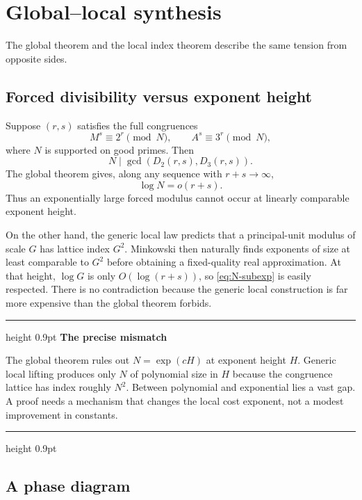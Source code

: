\documentclass[11pt,oneside]{article}
\theoremstyle{definition}
\newenvironment{resultbox}[1]{%
  \par\medskip\noindent
  \begin{minipage}{\linewidth}
  \hrule height 0.9pt\vspace{0.5em}
  {\color{deepteal}\bfseries #1}\par\smallskip
}{%
  \vspace{0.35em}\hrule height 0.9pt
  \end{minipage}\par\medskip
}
\begin{document}
\section{Global--local synthesis}\label{sec:synthesis}

The global theorem and the local index theorem describe the same tension
from opposite sides.

\subsection{Forced divisibility versus exponent height}

Suppose $(r,s)$ satisfies the full congruences
\begin{equation}\label{eq:forced-divisibility}
  M^s\equiv2^r\pmod N,
  \qquad
  A^s\equiv3^r\pmod N,
\end{equation}
where $N$ is supported on good primes.  Then
\begin{equation}\label{eq:N-gcd}
  N\mid\gcd(D_2(r,s),D_3(r,s)).
\end{equation}
The global theorem gives, along any sequence with $r+s\to\infty$,
\begin{equation}\label{eq:N-subexp}
  \log N=o(r+s).
\end{equation}
Thus an exponentially large forced modulus cannot occur at linearly
comparable exponent height.

On the other hand, the generic local law predicts that a principal-unit
modulus of scale $G$ has lattice index $G^2$.  Minkowski then naturally
finds exponents of size at least comparable to $G^2$ before obtaining a
fixed-quality real approximation.  At that height, $\log G$ is only
$O(\log(r+s))$, so \eqref{eq:N-subexp} is easily respected.  There is no
contradiction because the generic local construction is far more expensive
than the global theorem forbids.

\begin{resultbox}{The precise mismatch}
The global theorem rules out $N=\exp(cH)$ at exponent height $H$.
Generic local lifting produces only $N$ of polynomial size in $H$ because
the congruence lattice has index roughly $N^2$.  Between polynomial and
exponential lies a vast gap.  A proof needs a mechanism that changes the
local cost exponent, not a modest improvement in constants.
\end{resultbox}

\subsection{A phase diagram}
\end{document}
